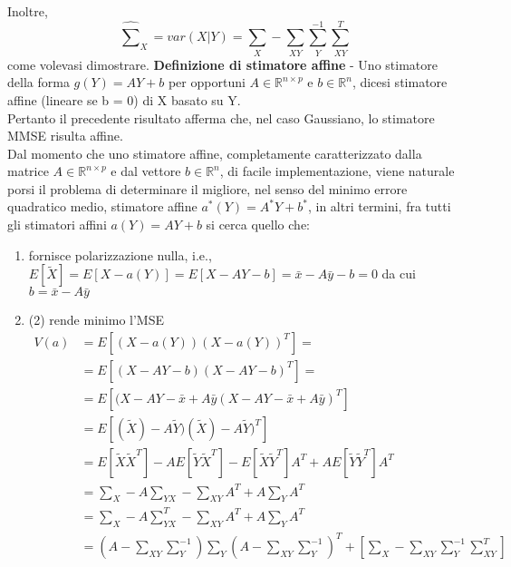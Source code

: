 Inoltre,
\begin{equation}
\widehat{\sum}_X=var(X|Y)=\sum_X- \sum_{XY}\sum_Y^{-1}\sum_{XY}^T \nonumber
\end{equation}
come volevasi dimostrare.
\newpage
\textbf{Definizione di stimatore affine} - Uno stimatore della forma $g(Y)=AY+b$ per opportuni $A \in\mathbb{R}^{n\times p}$ e $b\in\mathbb{R}^n$, dicesi stimatore affine (lineare se b = 0) di X basato su Y.\\
Pertanto il precedente risultato afferma che, nel caso Gaussiano, lo stimatore MMSE risulta affine. \\
Dal momento che uno stimatore affine, completamente caratterizzato dalla matrice $A \in\mathbb{R}^{n\times p}$ e dal vettore $b\in\mathbb{R}^n$, di facile implementazione, viene naturale porsi
il problema di determinare il migliore, nel senso del minimo errore quadratico medio, stimatore affine $a^*(Y)=A^*Y+b^* $, in altri termini, fra tutti gli stimatori affini $a(Y)=AY + b $ si cerca quello che:
\begin{enumerate}
\item fornisce polarizzazione nulla, i.e.,
$E[\tilde{X}]=E[X-a(Y)]=E[X-AY-b]=\bar{x}-A\bar{y}-b=0 $
da cui 
$b =\bar{x}-A\bar{y}$\\

\item (2) rende minimo l’MSE\\
\begin{align}
 V(a)&=E[(X-a(Y))(X-a(Y))^T] =\nonumber\\
&=E[(X-AY-b)(X-AY-b)^T ] =\nonumber\\
&=E[(X-AY-\bar{x}+A\bar{y}(X-AY-\bar{x}+A\bar{y})^T] \nonumber\\
&=E[(\tilde{X})-A\tilde{Y})(\tilde{X})-A\tilde{Y})^T]\nonumber \\
&=E[\tilde{X}\tilde{X}^T]-AE[\tilde{Y}\tilde{X}^T]-E[\tilde{X}\tilde{Y}^T]A^T+AE[\tilde{Y}\tilde{Y}^T]A^T \nonumber\\
&=\sum_X-A\sum_{YX}-\sum_{XY}A^T+A\sum_YA^T \nonumber\\
&=\sum_X-A\sum_{YX}^T-\sum_{XY}A^T+A\sum_YA^T \nonumber\\
&=(A-\sum_{XY}\sum_{Y}^{-1})\sum_{Y}(A-\sum_{XY}\sum_{Y}^{-1})^T+[\sum_X-\sum_{XY}\sum_Y^{-1}\sum_{XY}^T]\nonumber\\
\end{align}
\end{enumerate}

